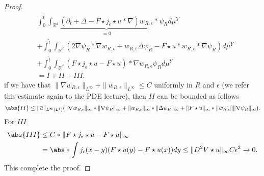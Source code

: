 \begin{proof}
\begin{align*}
  &\int_{0}^{\tilde{t} } \int_{\mathbb{R}^{d} } \underbrace{(\partial_t  + \Delta -  F \star j_{\epsilon} \star u * \nabla) w_{R,\epsilon}}_{=0}*\psi_{R} d\mu^Y \\
  &+  \int_0^{\tilde{t} } \int_{\mathbb{R}^{d} } (2 \nabla \psi_R * \nabla w_{R,\epsilon} + w_{R,\epsilon} \Delta \psi_{R} - F \star  u *w_{R,\epsilon}*\nabla \psi_{R}) d\mu^Y \\
  &+ \int_0^{\tilde{t} } \int_{\mathbb{R}^{d} } ( F \star  j_{\epsilon} \star  u - F \star  u) * \nabla w_{R,\epsilon}\psi_{R} d\mu^Y\\
  &= I + II + III
.\end{align*}
if we have that $\|\nabla w_{R,\epsilon}\|_{L^{\infty} } + \|w_{R,\epsilon}\|_{L^{\infty} } \le  C$ uniformly in $R$ and $\epsilon$ (we refer this estimate again to the PDE lecture),
then $II$ can be bounded as follows
\begin{align*}
  \abs{II}\le \|\overline{u}\|_{L^{\infty}(L^{1} ) } (\|\nabla w_{R,\epsilon}\|_{\infty}*\|\nabla \psi_R\|_{\infty}+\|w_{R,\epsilon}\|_{\infty}*\|\Delta  \psi_R\|_{\infty} +\|F\star  u\|_{\infty} * \|w_{R,\epsilon}\|\|\nabla \psi_R\|_{\infty})
.\end{align*}
For $III$ 
\begin{align*}
  \abs{III}&\le C*\|F \star  j_{\epsilon} \star u - F \star  u \|_{\infty} \\
           &= \abs*{\int j_{\epsilon}(x-y)(F \star  u (y) - F \star  u(x)) dy}\le  \|D^2 V \star  u \|_{\infty} C \epsilon ^2 \xrightarrow{} 0
.\end{align*}
This complete the proof.
\end{proof}

